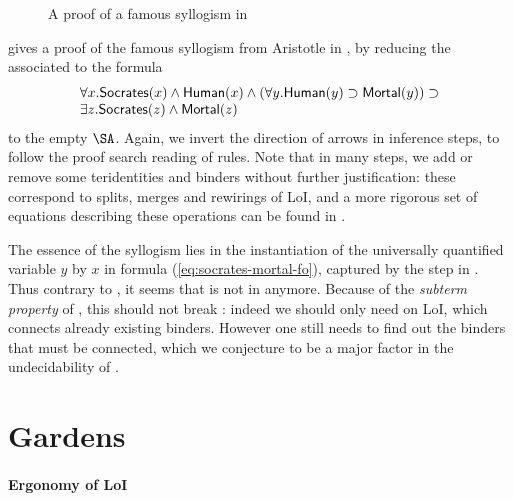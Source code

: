 \begin{scope}
\begin{scope}
\begin{figure*}
  
  \caption{A proof of a famous syllogism in }
\end{figure*}

 gives a proof of the famous syllogism from Aristotle
in , by reducing the  associated to the formula
\begin{equation}
  \begin{array}{l}
    \forall x. \mbox{\textsf{Socrates}}(x) \land \mbox{\textsf{Human}}(x) \land (\forall y. \mbox{\textsf{Human}}(y) \supset \mbox{\textsf{Mortal}}(y)) \supset \\
    \exists z. \mbox{\textsf{Socrates}}(z) \land \mbox{\textsf{Mortal}}(z) \label{eq:socrates-mortal-fo}
  \end{array}
\end{equation}
to the empty $\SA$. Again, we invert the direction of arrows in inference steps,
to follow the proof search reading of rules. Note that in many steps, we add or
remove some teridentities and binders without further justification: these
correspond to splits, merges and rewirings of LoI, and a more rigorous set of
equations describing these operations can be found in \cite[Section 3: ``The
algebra of lines of identity'']{pietarinen_compositional_2020}.

The essence of the syllogism lies in the instantiation of the universally
quantified variable $y$ by $x$ in formula (\ref{eq:socrates-mortal-fo}),
captured by the  step in . Thus
contrary to , it seems that  is not  in
 anymore. Because of the \emph{subterm property} of 
, this should not break :
indeed we should only need  on LoI, which connects already
existing binders. However one still needs to find out the binders that must be
connected, which we conjecture to be a major factor in the undecidability of
.

\section{Gardens}

\paragraph{Ergonomy of LoI}


\end{scope}
\end{scope}
